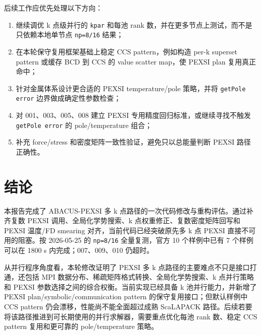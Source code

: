 \documentclass[a4paper,11pt]{article}
\newcommand{\code}[1]{\texttt{#1}}
\begin{document}
后续工作应优先处理以下方向：

\begin{enumerate}
    \item 继续调优 k 点级并行的 \code{kpar} 和每池 rank 数，并在更多节点上测试，而不是只依赖本地单节点 \code{np=8/16} 结果；
    \item 在本轮保守复用框架基础上稳定 CCS pattern，例如构造 per-k superset pattern 或缓存 BCD 到 CCS 的 value scatter map，使 PEXSI plan 复用真正命中；
    \item 针对金属体系设计更合适的 PEXSI temperature/pole 策略，并将 \code{getPole error} 边界做成确定性参数检查；
    \item 对 001、003、005、008 建立 PEXSI 专用精度回归标准，或继续寻找不触发 \code{getPole error} 的 pole/temperature 组合；
    \item 补充 force/stress 和密度矩阵一致性验证，避免只以总能量判断 PEXSI 路径正确性。
\end{enumerate}

\section{结论}

本报告完成了 ABACUS-PEXSI 多 k 点路径的一次代码修改与重构评估。通过补齐复数 PEXSI 调用、全局化学势搜索、k 点权重修正、复数密度矩阵回写和 PEXSI 温度/FD smearing 对齐，当前代码已经突破原先多 k 点 PEXSI 直接不可用的阻塞。按 2026-05-25 的 \code{np=8/16} 全量复测，官方 10 个样例中已有 7 个样例可以在 1800 s 内完成；007、009、010 仍超时。

从并行程序角度看，本轮修改证明了 PEXSI 多 k 点路径的主要难点不只是接口打通，还包括 MPI 数据分布、稀疏矩阵格式转换、全局化学势搜索、k 点并行策略和 PEXSI 参数选择之间的综合权衡。当前实现已经具备 k 池并行能力，并新增了 PEXSI plan/symbolic/communication pattern 的保守复用接口；但默认样例中 CCS pattern 仍会漂移，性能尚不能全面超过成熟 ScaLAPACK 路径。后续若要将该路径推进到可长期使用的并行求解器，需要重点优化每池 rank 数、稳定 CCS pattern 复用和更可靠的 pole/temperature 策略。
\end{document}
